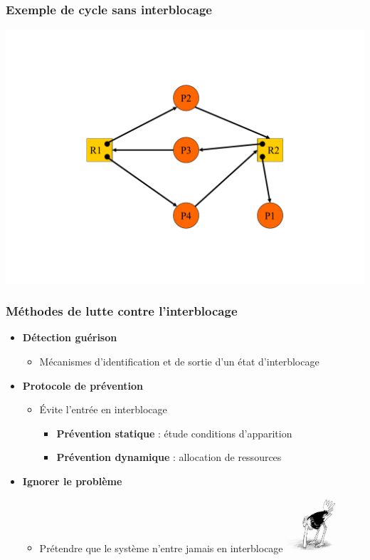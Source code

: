 \begin{frame}
\frametitle{Exemple de cycle sans interblocage}
\includegraphics[width=.8\textwidth]{../illustration/graphe_alloc_ressource_cycle_sans_ib.pdf}
\end{frame}

\begin{frame}
\frametitle{Méthodes de lutte contre l’interblocage}
\begin{itemize}
\item \textbf{Détection guérison}
\begin{itemize}
\item Mécanismes d’identification et de sortie d’un état d’interblocage
\end{itemize}
\item \textbf{Protocole de prévention}
\begin{itemize}
\item Évite l’entrée en interblocage
\begin{itemize}
\item \textbf{Prévention statique} : étude conditions d’apparition
\item \textbf{Prévention dynamique} : allocation de ressources
\end{itemize}
\end{itemize}
\item \textbf{Ignorer le problème}
\begin{itemize}
\item Prétendre que le système n’entre jamais en interblocage
\includegraphics[width=2cm]{../illustration/autruche.jpg}
\end{itemize}
\end{itemize}
\end{frame}

